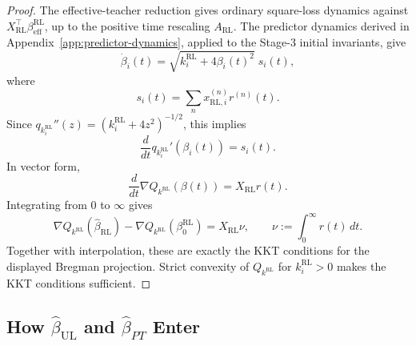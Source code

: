 \documentclass[11pt]{article}
\begin{document}
\begin{proof}
The effective-teacher reduction gives ordinary square-loss dynamics against \(X_{\mathrm{RL}}^\top\beta_{\mathrm{eff}}^{\mathrm{RL}}\), up to the positive time rescaling \(A_{\mathrm{RL}}\). The predictor dynamics derived in Appendix~\ref{app:predictor-dynamics}, applied to the Stage-3 initial invariants, give
\begin{equation}
    \dot\beta_i(t)
    =
    \sqrt{k_i^{\mathrm{RL}}+4\beta_i(t)^2}\;s_i(t),
\end{equation}
where
\begin{equation}
    s_i(t)
    =
    \sum_n x_{\mathrm{RL},i}^{(n)}r^{(n)}(t).
\end{equation}
Since \(q_{k_i^{\mathrm{RL}}}''(z)=(k_i^{\mathrm{RL}}+4z^2)^{-1/2}\), this implies
\begin{equation}
    \frac{d}{dt}
    q_{k_i^{\mathrm{RL}}}'(\beta_i(t))
    =
    s_i(t).
\end{equation}
In vector form,
\begin{equation}
    \frac{d}{dt}
    \nabla Q_{k^{\mathrm{RL}}}(\beta(t))
    =
    X_{\mathrm{RL}}r(t).
\end{equation}
Integrating from \(0\) to \(\infty\) gives
\begin{equation}
    \nabla Q_{k^{\mathrm{RL}}}(\widehat\beta_{\mathrm{RL}})
    -
    \nabla Q_{k^{\mathrm{RL}}}(\beta_0^{\mathrm{RL}})
    =
    X_{\mathrm{RL}}\nu,
    \qquad
    \nu:=\int_0^\infty r(t)\,dt.
\end{equation}
Together with interpolation, these are exactly the KKT conditions for the displayed Bregman projection. Strict convexity of \(Q_{k^{\mathrm{RL}}}\) for \(k_i^{\mathrm{RL}}>0\) makes the KKT conditions sufficient.
\end{proof}

\subsection{How \texorpdfstring{\(\widehat\beta_{\mathrm{UL}}\)}{betaUL} and \texorpdfstring{\(\widehat\beta_{PT}\)}{betaPT} Enter}
\end{document}
